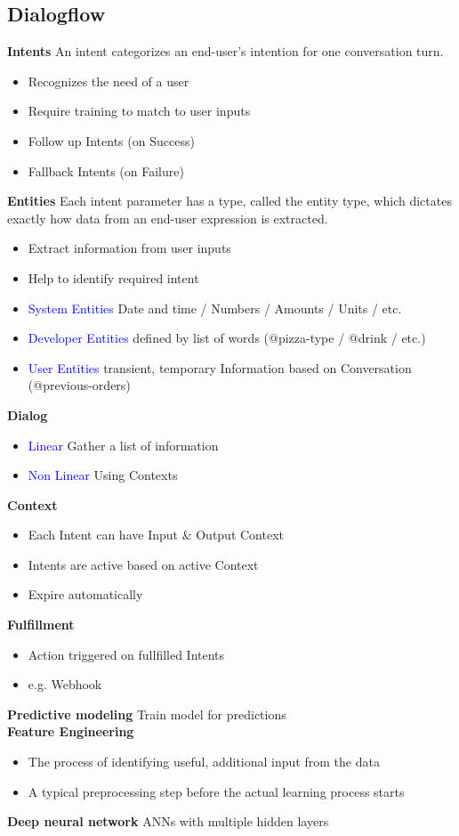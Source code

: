 \subsection{Dialogflow}
\textbf{Intents}
An intent categorizes an end-user's intention for one conversation turn.
\begin{itemize}
    \item Recognizes the need of a user
    \item Require training to match to user inputs
    \item Follow up Intents (on Success)
    \item Fallback Intents (on Failure)
\end{itemize}
\textbf{Entities}
Each intent parameter has a type, called the entity type, which dictates exactly how data from an end-user expression is extracted.
\begin{itemize}
    \item Extract information from user inputs
    \item Help to identify required intent
    \item \textcolor{blue}{System Entities} Date and time / Numbers / Amounts / Units / etc.
    \item \textcolor{blue}{Developer Entities} defined by list of words (@pizza-type / @drink / etc.)
    \item \textcolor{blue}{User Entities} transient, temporary Information based on Conversation (@previous-orders)
\end{itemize}
\textbf{Dialog}
\begin{itemize}
    \item \textcolor{blue}{Linear} Gather a list of information
    \item \textcolor{blue}{Non Linear} Using Contexts
\end{itemize}
\textbf{Context}
\begin{itemize}
    \item Each Intent can have Input \& Output Context
    \item Intents are active based on active Context
    \item Expire automatically
\end{itemize}
\textbf{Fulfillment}
\begin{itemize}
    \item Action triggered on fullfilled Intents
    \item e.g. Webhook
\end{itemize}
\textbf{Predictive modeling} Train model for predictions \\
\textbf{Feature Engineering}
\begin{itemize}
    \item The process of identifying useful, additional input from the data
    \item A typical preprocessing step before the actual learning process starts
\end{itemize}
\textbf{Deep neural network} ANNs with multiple hidden layers \\

